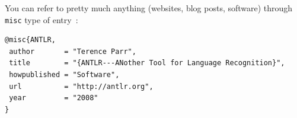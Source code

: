\documentclass{uvamscse}
\begin{document}
You can refer to pretty much anything (websites, blog posts, software) through
\texttt{misc} type of entry~\cite{ANTLR}:

\begin{snippet}
\begin{verbatim}
@misc{ANTLR,
 author       = "Terence Parr",
 title        = "{ANTLR---ANother Tool for Language Recognition}",
 howpublished = "Software",
 url          = "http://antlr.org",
 year         = "2008"
}
\end{verbatim}
\end{snippet}

{%


}
\end{document}

